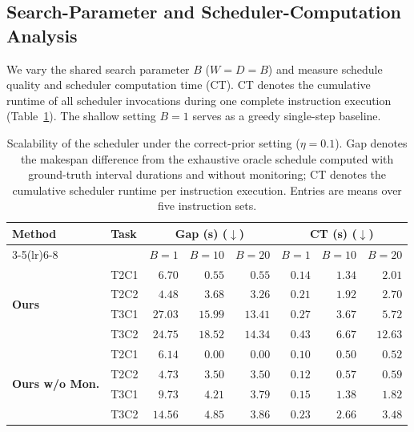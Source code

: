 \documentclass[letterpaper,10pt,onecolumn]{IEEEtran}
\begin{document}
\subsection{Search-Parameter and Scheduler-Computation Analysis}
\label{supp:scalability}
We vary the shared search parameter $B$ ($W{=}D{=}B$) and measure schedule quality and scheduler computation time (CT). CT denotes the cumulative runtime of all scheduler invocations during one complete instruction execution (Table~\ref{tab:supp_scalability}). The shallow setting $B{=}1$ serves as a greedy single-step baseline.
\begin{table}[H]
\centering
\caption{Scalability of the scheduler under the correct-prior setting
($\eta{=}0.1$). Gap denotes the makespan difference from the exhaustive oracle schedule computed with ground-truth interval durations and without monitoring; CT denotes the cumulative scheduler runtime per instruction execution. Entries are means over five instruction sets.}
\label{tab:supp_scalability}
{\small
\setlength{\tabcolsep}{3.5pt}
\begin{tabular}{@{}llrrrrrr@{}}
\toprule
\multirow{2}{*}{\textbf{Method}} & \multirow{2}{*}{\textbf{Task}} &
\multicolumn{3}{c}{\textbf{Gap (s)} ($\downarrow$)} &
\multicolumn{3}{c}{\textbf{CT (s)} ($\downarrow$)} \\
\cmidrule(lr){3-5}\cmidrule(lr){6-8}
& & \textbf{$B{=}1$} & \textbf{$B{=}10$} & \textbf{$B{=}20$} &
\textbf{$B{=}1$} & \textbf{$B{=}10$} & \textbf{$B{=}20$} \\
\midrule
\multirow{4}{*}{\textbf{Ours}} & T2C1 & $6.70$ & $0.55$ & $0.55$ & $0.14$ & $1.34$ & $2.01$ \\
 & T2C2 & $4.48$ & $3.68$ & $3.26$ & $0.21$ & $1.92$ & $2.70$ \\
 & T3C1 & $27.03$ & $15.99$ & $13.41$ & $0.27$ & $3.67$ & $5.72$ \\
 & T3C2 & $24.75$ & $18.52$ & $14.34$ & $0.43$ & $6.67$ & $12.63$ \\
\midrule
\multirow{4}{*}{\textbf{Ours w/o Mon.}} & T2C1 & $6.14$ & $0.00$ & $0.00$ & $0.10$ & $0.50$ & $0.52$ \\
 & T2C2 & $4.73$ & $3.50$ & $3.50$ & $0.12$ & $0.57$ & $0.59$ \\
 & T3C1 & $9.73$ & $4.21$ & $3.79$ & $0.15$ & $1.38$ & $1.82$ \\
 & T3C2 & $14.56$ & $4.85$ & $3.86$ & $0.23$ & $2.66$ & $3.48$ \\
\bottomrule
\end{tabular}
}
\end{table}
\end{document}
